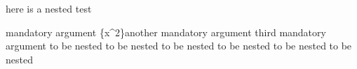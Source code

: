 here is a nested test
\begin{one}
	{%
		mandatory argument}%
	{%
		\{x^2\}another mandatory argument}%
	{%
		third mandatory argument}
	to be nested to be nested
	to be nested to be nested
	to be nested to be nested
\end{one}
